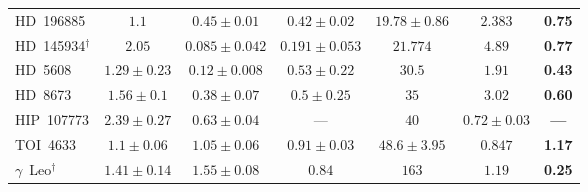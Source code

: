 \documentclass{aa}
\newcommand{\rev}[1]{{\color{red}\textbf{#1}}}
\begin{document}
\begin{appendix}
\begin{table}
\begin{tabular}{lcccccc}
HD~196885              & $1.1$         & $0.45\pm0.01$  & $0.42\pm0.02$   & $19.78\pm0.86$ & $2.383$ & \rev{0.75} \\
HD~145934$^\dagger$    & $2.05$        & $0.085\pm0.042$& $0.191\pm0.053$ & $21.774$       & $4.89$ & \rev{0.77} \\
HD~5608                & $1.29\pm0.23$ & $0.12\pm0.008$ & $0.53\pm0.22$   & $30.5$         & $1.91$ & \rev{0.43} \\
HD~8673                & $1.56\pm0.1$  & $0.38\pm0.07$  & $0.5\pm0.25$    & $35$           & $3.02$ & \rev{0.60} \\
HIP~107773             & $2.39\pm0.27$ & $0.63\pm0.04$  & ---             & $40$           & $0.72\pm0.03$ & \rev{---} \\
TOI~4633               & $1.1\pm0.06$  & $1.05\pm0.06$  & $0.91\pm0.03$   & $48.6\pm3.95$  & $0.847$ & \rev{1.17} \\
$\gamma$~Leo$^\dagger$ & $1.41\pm0.14$ & $1.55\pm0.08$  & $0.84$          & $163$          & $1.19$ & \rev{0.25} \\
\hline
\end{tabular}
\end{table}

\end{appendix}
\end{document}
